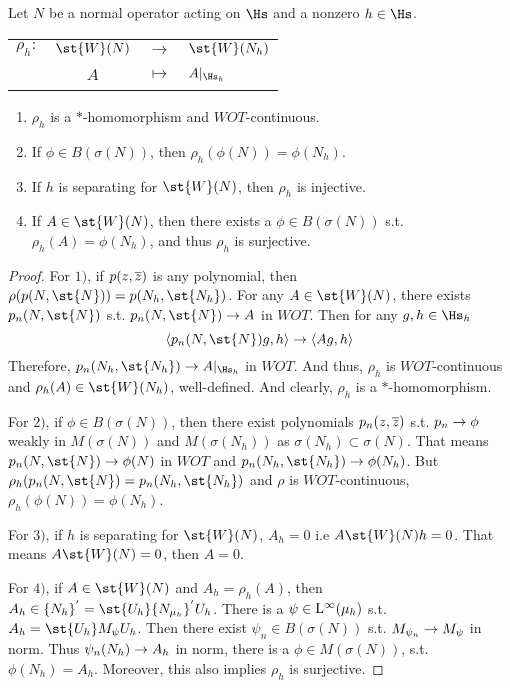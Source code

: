 \begin{prop}
	Let $N$ be a normal operator acting on $\Hs$ and a nonzero $h \in \Hs$.
	\begin{center}
		\begin{tabular}{l c c l}
			$\rho_h \colon$ & $\st{W}(N)$ & $\longrightarrow$ & $\st{W}(N_h)$ \\
			~ & $A$ & $\longmapsto$ & $A|_{\Hs_h}$
		\end{tabular}
	\end{center}
	\begin{enumerate}[label=\arabic*)]
		\item $\rho_h$ is a $*$-homomorphism and $WOT$-continuous.
		\item If $\phi \in B(\sigma(N))$, then $\rho_h(\phi(N)) = \phi(N_h)$.
		\item If $h$ is separating for $\st{W}(N)$, then $\rho_h$ is injective.
		\item If $A \in \st{W}(N)$, then there exists a $\phi \in B(\sigma(N))$ s.t. $\rho_h(A) = \phi(N_h)$, and thus $\rho_h$ is surjective.
	\end{enumerate}
\end{prop}
\begin{proof}
	For $1)$, if $p(z,\overline{z})$ is any polynomial, then $\rho(p(N,\st{N})) = p(N_h,\st{N_h})$. For any $A \in \st{W}(N)$, there exists $p_n(N,\st{N})$ s.t. $p_n(N,\st{N}) \sto A$ in $WOT$. Then for any $g,h \in \Hs_h$
	\begin{equation*}
		\langle p_n(N,\st{N})g,h \rangle \sto \langle Ag,h \rangle
	\end{equation*}
	Therefore, $p_n(N_h,\st{N_h}) \sto A|_{\Hs_h}$ in $WOT$. And thus, $\rho_h$ is $WOT$-continuous and $\rho_h(A) \in \st{W}(N_h)$, well-defined. And clearly, $\rho_h$ is a $*$-homomorphism.

	\item For $2)$, if $\phi \in B(\sigma(N))$, then there exist polynomials $p_n(z,\overline{z})$ s.t. $p_n \rightarrow \phi$ weakly in $M(\sigma(N))$ and $M(\sigma(N_h))$ as $\sigma(N_h) \subset \sigma(N)$. That means $p_n(N,\st{N}) \sto \phi(N)$ in $WOT$ and $p_n(N_h,\st{N_h}) \sto \phi(N_h)$. But $\rho_h(p_n(N,\st{N}) = p_n(N_h,\st{N_h})$ and $\rho$ is $WOT$-continuous, $\rho_h(\phi(N)) = \phi(N_h)$.

	\item For $3)$, if $h$ is separating for $\st{W}(N)$, $A_h = 0$ i.e $A\st{W}(N)h = 0$. That means $A\st{W}(N)=0$, then $A = 0$.

	\item For $4)$, if $A \in \st{W}(N)$ and $A_h = \rho_h(A)$, then $A_h \in \{N_h\}^{'} =\st{U_h}\{N_{\mu_h}\}^{'}U_h$. There is a $\psi \in \mathrm{L^{\infty}}(\mu_h)$ s.t. $A_h = \st{U_h}M_{\psi} U_h$. Then there exist $\psi_n \in B(\sigma(N))$ s.t. $M_{\psi_n} \rightarrow M_{\psi}$ in norm. Thus $\psi_n(N_h) \rightarrow A_h$ in norm, there is a $\phi \in M(\sigma(N))$, s.t. $\phi(N_h) = A_h$. Moreover, this also implies $\rho_h$ is surjective.
\end{proof}
